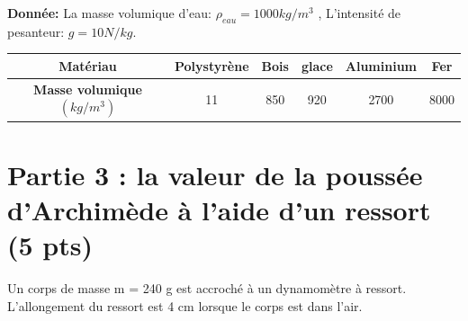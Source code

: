 \documentclass[12pt]{article}
\begin{document}
\textbf{Donnée: } La masse volumique d'eau: $\rho_{eau} = 1000 kg/m^3$ , L'intensité de pesanteur: $g = 10N/kg$.

\begin{center}
\begin{tabular}{ |c| c| c| c|c|c| }
	\hline
	\textbf{Matériau}                   & Polystyrène & Bois &glace &Aluminium&Fer\\\hline 
	\textbf{Masse volumique} $(kg/m^3)$ & 11 & 850 &920 &2700& 8000\\\hline
\end{tabular}
\end{center}

\section*{Partie 3 : la valeur de la poussée d'Archimède à l'aide d'un ressort \dotfill(5 pts)}



Un corps de masse m = 240 g est accroché à un dynamomètre à ressort.
L’allongement du ressort est 4 cm lorsque le corps est dans l’air.
\end{document}
